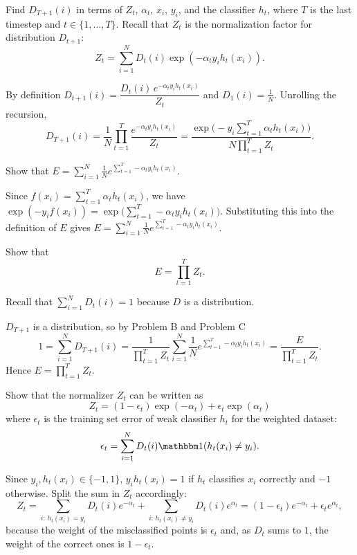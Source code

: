 \documentclass{article}
\begin{document}
\problem[3]
Find $D_{T + 1}(i)$ in terms of $Z_t$, $\alpha_t$, $x_i$, $y_i$, and the classifier $h_t$, where $T$ is the last timestep and $t \in \{1, \ldots, T\}$. Recall that $Z_t$ is the normalization factor for distribution $D_{t+1}$:
$$Z_t = \sum\limits_{i=1}^N D_t(i) \exp(-\alpha_{t}y_{i}h_{t}(x_{i})).$$

\begin{solution}
\upshape
By definition $D_{t+1}(i)=\dfrac{D_t(i)\,e^{-\alpha_t y_ih_t(x_i)}}{Z_t}$ and $D_1(i)=\frac1N$. Unrolling the recursion,
\[
D_{T+1}(i)=\frac1N\prod_{t=1}^{T}\frac{e^{-\alpha_ty_ih_t(x_i)}}{Z_t}
=\frac{\exp\!\big(-y_i\sum_{t=1}^T\alpha_th_t(x_i)\big)}{N\prod_{t=1}^TZ_t}.
\]
\end{solution}

\problem[2]
Show that $E = \sum_{i=1}^N  \frac{1}{N} e^{\sum_{t=1}^T -\alpha_t y_i h_t(x_i)}.$

\begin{solution}
\upshape
Since $f(x_i)=\sum_{t=1}^T\alpha_th_t(x_i)$, we have $\exp(-y_if(x_i))=\exp\big(\sum_{t=1}^T-\alpha_ty_ih_t(x_i)\big)$. Substituting this into the definition of $E$ gives
$E=\sum_{i=1}^N\frac1N e^{\sum_{t=1}^T-\alpha_ty_ih_t(x_i)}$.
\end{solution}

\problem[5]
Show that
$$E = \prod\limits_{t=1}^T Z_t.$$

\begin{hint}
	Recall that $\sum_{i = 1}^N D_t(i) = 1$ because $D$ is a distribution.
\end{hint}

\begin{solution}
\upshape
$D_{T+1}$ is a distribution, so by Problem B and Problem C
\[
1=\sum_{i=1}^ND_{T+1}(i)=\frac{1}{\prod_{t=1}^TZ_t}\sum_{i=1}^N\frac1N e^{\sum_{t=1}^T-\alpha_ty_ih_t(x_i)}=\frac{E}{\prod_{t=1}^TZ_t}.
\]
Hence $E=\prod_{t=1}^TZ_t$.
\end{solution}

\problem[5]
Show that the normalizer $Z_t$ can be written as
\[Z_t = (1 - \epsilon_t) \exp(-\alpha_t) + \epsilon_{t} \exp(\alpha_t)\]
where $\epsilon_t$ is the training set error of weak classifier $h_t$ for the weighted dataset:
\[\epsilon_t = \sum\limits_{i=1}^N D_t(i)\mathbbm1(h_t(x_i) \neq y_i).\]

\begin{solution}
\upshape
Since $y_i,h_t(x_i)\in\{-1,1\}$, $y_ih_t(x_i)=1$ if $h_t$ classifies $x_i$ correctly and $-1$ otherwise. Split the sum in $Z_t$ accordingly:
\[
Z_t=\sum_{i:\,h_t(x_i)=y_i}D_t(i)e^{-\alpha_t}+\sum_{i:\,h_t(x_i)\ne y_i}D_t(i)e^{\alpha_t}
=(1-\epsilon_t)e^{-\alpha_t}+\epsilon_te^{\alpha_t},
\]
because the weight of the misclassified points is $\epsilon_t$ and, as $D_t$ sums to $1$, the weight of the correct ones is $1-\epsilon_t$.
\end{solution}
\end{document}
